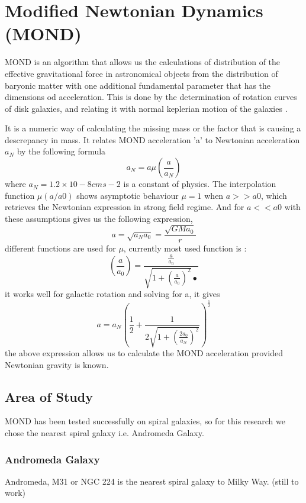   \chapter{Modified Newtonian Dynamics (MOND) }

MOND is an algorithm that allows us the calculations of distribution of the effective gravitational force in astronomical objects from the distribution of baryonic matter with one additional fundamental parameter that has the dimensions od acceleration. This  is done by the determination of rotation curves of disk galaxies, and relating it with normal keplerian motion of the galaxies \cite{dm_2}.

 It is a numeric way of calculating the missing mass or the factor that is causing a descrepancy in mass. It relates MOND acceleration 'a' to Newtonian acceleration $a_{N}$ by the following formula \begin{equation}
 a_{N}= a\mu(\frac{a}{a_{N}})
\end{equation}
where $a_{N} = 1.2×10-8  cms-2$  is a constant of physics.
The interpolation function $\mu (a/a0)$ shows asymptotic behaviour $\mu=1$ when $a>> a0$,  which retrieves the Newtonian expression in strong field regime. And for $a << a0$ with these assumptions gives us the following expression,
\begin{equation}
a= \sqrt{a_{N}a_{0}}= \frac{\sqrt{GMa_{0}}}{r}
\end{equation}
different functions are used for $\mu$, currently most used function is :
\begin{equation}
(\frac{a}{a_{0}}) = \frac{\frac{a}{a_{0}}}{\sqrt{1+(\frac{a}{a_{0}})^2}•}
\end{equation}
it works well for galactic rotation and solving for a, it gives
\begin{equation}
a= a_{N}(\frac{1}{2}+\frac{1}{2\sqrt{1+(\frac{2a_{0}}{a_{N}})^2}})^\frac{1}{2}
\end{equation}
the above expression allows us to calculate the MOND acceleration provided Newtonian gravity is known.

\section{Area of Study}
  MOND has been tested successfully on spiral galaxies, so for this research we chose the nearest spiral galaxy i.e. Andromeda Galaxy. 

\subsection{Andromeda Galaxy}
  Andromeda, M31 or NGC 224 is the nearest spiral galaxy to Milky Way.  (still to work)

